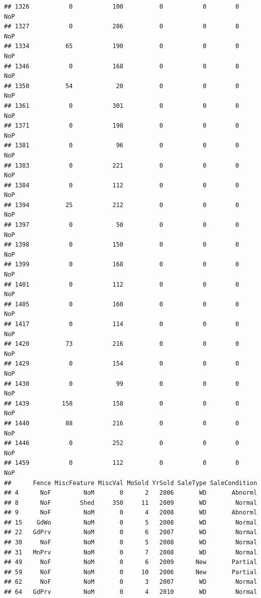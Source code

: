 \documentclass[]{article}
\begin{document}
\begin{verbatim}
## 1326           0           100          0           0        0    NoP
## 1327           0           286          0           0        0    NoP
## 1334          65           190          0           0        0    NoP
## 1346           0           168          0           0        0    NoP
## 1350          54            20          0           0        0    NoP
## 1361           0           301          0           0        0    NoP
## 1371           0           198          0           0        0    NoP
## 1381           0            96          0           0        0    NoP
## 1383           0           221          0           0        0    NoP
## 1384           0           112          0           0        0    NoP
## 1394          25           212          0           0        0    NoP
## 1397           0            50          0           0        0    NoP
## 1398           0           150          0           0        0    NoP
## 1399           0           168          0           0        0    NoP
## 1401           0           112          0           0        0    NoP
## 1405           0           160          0           0        0    NoP
## 1417           0           114          0           0        0    NoP
## 1420          73           216          0           0        0    NoP
## 1429           0           154          0           0        0    NoP
## 1430           0            99          0           0        0    NoP
## 1439         158           158          0           0        0    NoP
## 1440          88           216          0           0        0    NoP
## 1446           0           252          0           0        0    NoP
## 1459           0           112          0           0        0    NoP
##      Fence MiscFeature MiscVal MoSold YrSold SaleType SaleCondition
## 4      NoF         NoM       0      2   2006       WD       Abnorml
## 8      NoF        Shed     350     11   2009       WD        Normal
## 9      NoF         NoM       0      4   2008       WD       Abnorml
## 15    GdWo         NoM       0      5   2008       WD        Normal
## 22   GdPrv         NoM       0      6   2007       WD        Normal
## 30     NoF         NoM       0      5   2008       WD        Normal
## 31   MnPrv         NoM       0      7   2008       WD        Normal
## 49     NoF         NoM       0      6   2009      New       Partial
## 59     NoF         NoM       0     10   2006      New       Partial
## 62     NoF         NoM       0      3   2007       WD        Normal
## 64   GdPrv         NoM       0      4   2010       WD        Normal

\end{verbatim}
\end{document}
